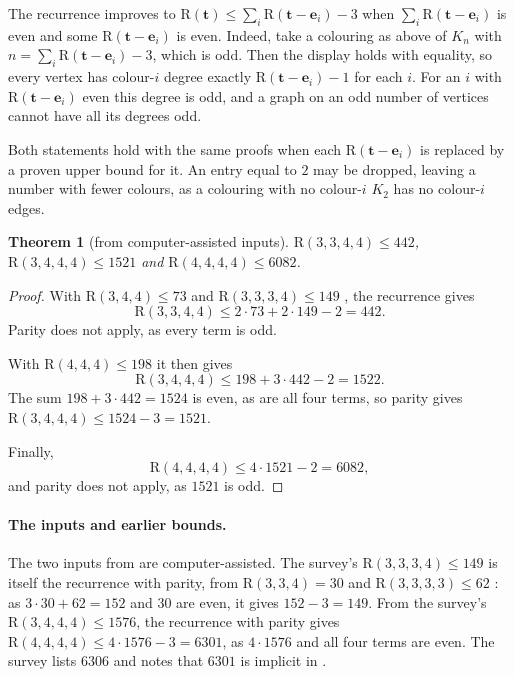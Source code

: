 \documentclass[11pt]{article}
\theoremstyle{spacedplain}
\newtheorem{theorem}{Theorem}[section]
\theoremstyle{spaceddef}
\theoremstyle{spacedremark}
\newcommand{\R}{\mathrm{R}}
\newcommand{\bt}{\mathbf{t}}
\newcommand{\e}{\mathbf{e}}
\begin{document}
The recurrence improves to $\R(\bt)\le\sum_i\R(\bt-\e_i)-3$ when $\sum_i\R(\bt-\e_i)$ is even and some $\R(\bt-\e_i)$ is even.
Indeed, take a colouring as above of $K_n$ with $n=\sum_i\R(\bt-\e_i)-3$, which is odd.
Then the display holds with equality, so every vertex has colour-$i$ degree exactly $\R(\bt-\e_i)-1$ for each $i$.
For an $i$ with $\R(\bt-\e_i)$ even this degree is odd, and a graph on an odd number of vertices cannot have all its degrees odd.

Both statements hold with the same proofs when each $\R(\bt-\e_i)$ is replaced by a proven upper bound for it.
An entry equal to $2$ may be dropped, leaving a number with fewer colours, as a colouring with no colour-$i$ $K_2$ has no colour-$i$ edges.

\begin{theorem}[from computer-assisted inputs]\label{thm:four}
$\R(3,3,4,4)\le 442$, $\R(3,4,4,4)\le 1521$ and $\R(4,4,4,4)\le 6082$.
\end{theorem}

\begin{proof}
With $\R(3,4,4)\le 73$ \cite[Theorem~8.3]{DC26} and $\R(3,3,3,4)\le 149$ \cite{Rad26}, the recurrence gives
\[
\R(3,3,4,4)\le 2\cdot 73+2\cdot 149-2=442 .
\]
Parity does not apply, as every term is odd.

With $\R(4,4,4)\le 198$ \cite[Theorem~8.2]{DC26} it then gives
\[
\R(3,4,4,4)\le 198+3\cdot 442-2=1522 .
\]
The sum $198+3\cdot 442=1524$ is even, as are all four terms, so parity gives $\R(3,4,4,4)\le 1524-3=1521$.

Finally,
\[
\R(4,4,4,4)\le 4\cdot 1521-2=6082 ,
\]
and parity does not apply, as $1521$ is odd.
\end{proof}

\paragraph{The inputs and earlier bounds.}
The two inputs from \cite{DC26} are computer-assisted.
The survey's $\R(3,3,3,4)\le 149$ is itself the recurrence with parity, from $\R(3,3,4)=30$ \cite{CFIM16} and $\R(3,3,3,3)\le 62$ \cite{FKR04}: as $3\cdot 30+62=152$ and $30$ are even, it gives $152-3=149$.
From the survey's $\R(3,4,4,4)\le 1576$, the recurrence with parity gives $\R(4,4,4,4)\le 4\cdot 1576-3=6301$, as $4\cdot 1576$ and all four terms are even.
The survey lists $6306$ and notes that $6301$ is implicit in \cite{Boz26}.
\end{document}
